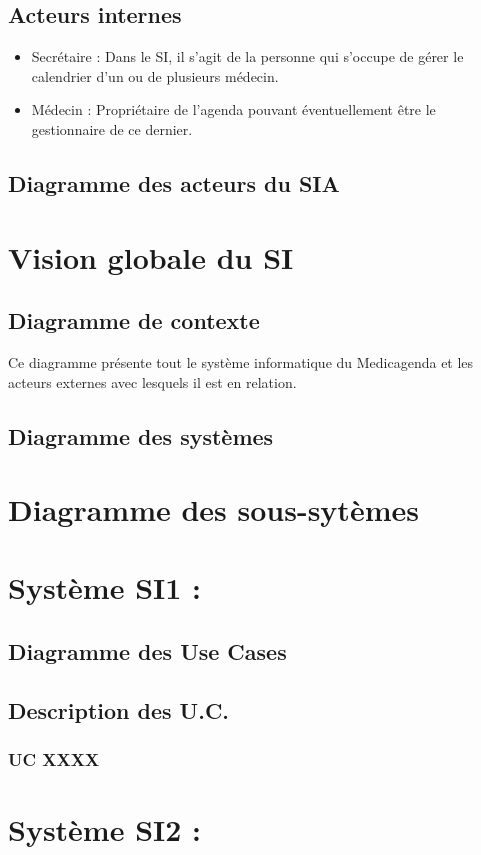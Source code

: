 \documentclass[a4paper, 11pt]{report}
\begin{document}
\subsection{Acteurs internes}
\begin{itemize}
	\item Secrétaire : Dans le SI, il s'agit de la personne qui s'occupe de
		gérer le calendrier d'un ou de plusieurs médecin.
	\item Médecin : Propriétaire de l'agenda pouvant éventuellement être le
		gestionnaire de ce dernier.
\end{itemize}
\subsection{Diagramme des acteurs du SIA}
\newpage
\section{Vision globale du SI}
\subsection{\label{dc}Diagramme de contexte}
Ce diagramme présente tout le système informatique du Medicagenda et les acteurs 
externes avec lesquels il est en relation. 
\subsection{Diagramme des systèmes}
\newpage
\section{Diagramme des sous-sytèmes}
\section{Système SI1 : }
\subsection{Diagramme des Use Cases}
\subsection{Description des U.C.}
\subsubsection{UC XXXX}
\section{Système SI2 : }
\end{document}
